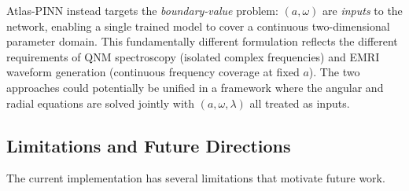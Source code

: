 \documentclass[aps,prd,twocolumn,superscriptaddress,nofootinbib]{revtex4-2}
\begin{document}
Atlas-PINN instead targets the \emph{boundary-value} problem: $(a,\omega)$ are
\emph{inputs} to the network, enabling a single trained model to cover a
continuous two-dimensional parameter domain.  This fundamentally different
formulation reflects the different requirements of QNM spectroscopy (isolated
complex frequencies) and EMRI waveform generation (continuous frequency
coverage at fixed $a$).  The two approaches could potentially be unified in a
framework where the angular and radial equations are solved jointly with
$(a,\omega,\lambda)$ all treated as inputs.

\subsection{Limitations and Future Directions}

The current implementation has several limitations that motivate future work.
\end{document}
